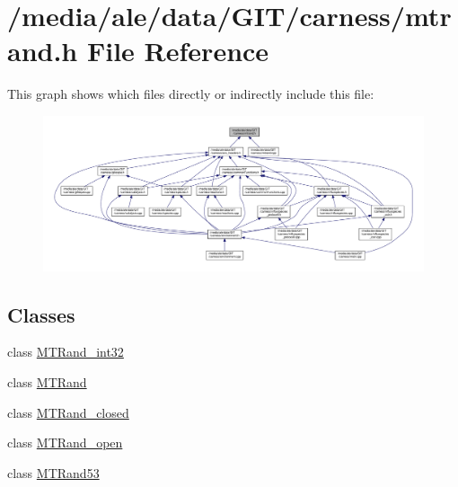 \hypertarget{a00083}{\section{/media/ale/data/\-G\-I\-T/carness/mtrand.h File Reference}
\label{a00083}
}
This graph shows which files directly or indirectly include this file\-:\nopagebreak
\begin{figure}[H]
\begin{center}
\leavevmode
\includegraphics[width=350pt]{a00156}
\end{center}
\end{figure}
\subsection*{Classes}
\begin{DoxyCompactItemize}
\item 
class \hyperlink{a00011}{M\-T\-Rand\-\_\-int32}
\item 
class \hyperlink{a00008}{M\-T\-Rand}
\item 
class \hyperlink{a00010}{M\-T\-Rand\-\_\-closed}
\item 
class \hyperlink{a00012}{M\-T\-Rand\-\_\-open}
\item 
class \hyperlink{a00009}{M\-T\-Rand53}
\end{DoxyCompactItemize}
